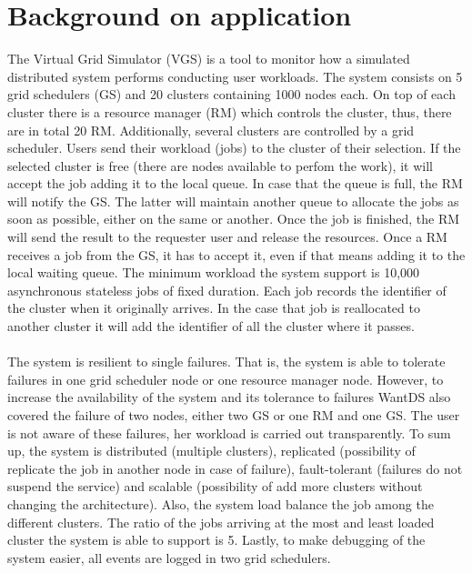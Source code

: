 \section{Background on application}
The Virtual Grid Simulator (VGS) is a tool to monitor how a simulated distributed system performs conducting user workloads. The system consists on 5 grid schedulers (GS) and 20 clusters containing 1000 nodes each. On top of each cluster there is a resource manager (RM) which controls the cluster, thus, there are in total 20 RM. Additionally, several clusters are controlled by a grid scheduler. Users send their workload (jobs) to the cluster of their selection. If the selected cluster is free (there are nodes available to perfom the work), it will accept the job adding it to the local queue. In case that the queue is full, the RM will notify the GS. The latter will maintain another queue to allocate the jobs as soon as possible, either on the same or another. Once the job is finished, the RM will send the result to the requester user and release the resources. Once a RM receives a job from the GS, it has to accept it, even if that means adding it to the local waiting queue. The minimum workload the system support is 10,000 asynchronous stateless jobs of fixed duration. Each job records the identifier of the cluster when it originally arrives. In the case that job is reallocated to another cluster it will add the identifier of all the cluster where it passes.
\\\\
The system is resilient to single failures. That is, the system is able to tolerate failures in one grid scheduler node or one resource manager node. However, to increase the availability of the system and its tolerance to failures WantDS also covered the failure of two nodes, either two GS or one RM and one GS. The user is not aware of these failures, her workload is carried out transparently. To sum up, the system is distributed (multiple clusters), replicated (possibility of replicate the job in another node in case of failure), fault-tolerant (failures do not suspend the service) and scalable (possibility of add more clusters without changing the architecture). Also, the system load balance the job among the different clusters. The ratio of the jobs arriving at the most and least loaded cluster the system is able to support is 5. Lastly, to make debugging of the system easier, all events are logged in two grid schedulers.
